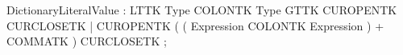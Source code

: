 %
%
%
\begin{rail}
DictionaryLiteralValue : LTTK Type COLONTK Type GTTK CUROPENTK CURCLOSETK
                | CUROPENTK ( ( Expression COLONTK Expression ) + COMMATK ) CURCLOSETK
                ;
\end{rail}
